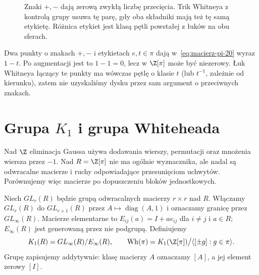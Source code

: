 \begin{figure}[htbp]
\centering
{}
\caption{Znaki $+,-$ dają zerową zwykłą liczbę przecięcia.
Trik Whitneya z kontrolą grupy usuwa tę parę, gdy oba
składniki mają też tę samą etykietę. Różnica etykiet jest
klasą pętli powstałej z łuków na obu sferach.}
\label{fig:etykiety-whitneya-20}
\end{figure}

\begin{przyklad}
Dwa punkty o znakach $+,-$ i etykietach $e,t\in\pi$
dają w~\eqref{eq:macierz-pi-20} wyraz $1-t$.
Po augmentacji jest to $1-1=0$, lecz w $\Z[\pi]$
może być niezerowy. Łuk Whitneya łączący te punkty
ma wówczas pętlę o klasie $t$ (lub $t^{-1}$, zależnie
od kierunku), zatem nie uzyskaliśmy dysku przez sam
argument o przeciwnych znakach.
\end{przyklad}

\section{Grupa \texorpdfstring{$K_1$}{K1} i grupa Whiteheada}
\label{sec:k1-wh-20}

Nad $\Z$ eliminacja Gaussa używa dodawania wierszy,
permutacji oraz mnożenia wiersza przez $-1$. Nad
$R=\Z[\pi]$ nie ma ogólnie wyznacznika, ale nadal są
odwracalne macierze i ruchy odpowiadające przesunięciom
uchwytów. Porównujemy więc macierze po dopuszczeniu
bloków jednostkowych.

\begin{definicja}[$K_1$ i $\operatorname{Wh}(\pi)$]
\label{def:k1-wh-20}
Niech $GL_r(R)$ będzie grupą odwracalnych macierzy
$r\times r$ nad $R$. Włączamy $GL_r(R)$ do $GL_{r+1}(R)$
przez $A\mapsto\operatorname{diag}(A,1)$ i oznaczamy
granicę przez $GL_\infty(R)$. Macierze elementarne
to $E_{ij}(a)=I+a e_{ij}$ dla $i\ne j$ i $a\in R$;
$E_\infty(R)$ jest generowaną przez nie podgrupą.
Definiujemy
\[
 K_1(R)=GL_\infty(R)/E_\infty(R),\qquad
 \operatorname{Wh}(\pi)
 =K_1(\Z[\pi])\big/\langle[\pm g]:g\in\pi\rangle.
\]
Grupę zapisujemy addytywnie: klasę macierzy $A$
oznaczamy $[A]$, a jej element zerowy $[I]$.
\end{definicja}

